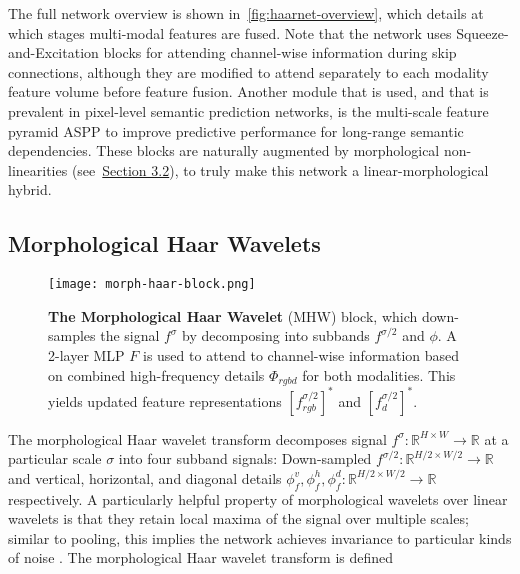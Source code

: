 \documentclass{article}
\begin{document}
The full network overview is shown in~\autoref{fig:haarnet-overview}, which details at which stages multi-modal features are fused.
Note that the network uses Squeeze-and-Excitation blocks \cite{hu2018squeeze} for attending channel-wise information during skip connections, although they are modified to attend separately to each modality feature volume before feature fusion.
Another module that is used, and that is prevalent in pixel-level semantic prediction networks, is the multi-scale feature pyramid ASPP \cite{chen2017deeplab} to improve predictive performance for long-range semantic dependencies.
These blocks are naturally augmented by morphological non-linearities (see~\hyperref[sec:method:relu-as-dilation]{Section 3.2}), to truly make this network a linear-morphological hybrid.


\subsection{Morphological Haar Wavelets} \label{sec:method:haar-module}
\begin{figure}[t]
\centering
\texttt{[image: morph-haar-block.png]}
\caption{
\textbf{The Morphological Haar Wavelet} (MHW) block, which down-samples the signal $f^{\sigma}$ by decomposing into subbands $f^{\sigma/2}$ and $\phi$. 
A 2-layer MLP $F$ is used to attend to channel-wise information based on combined high-frequency details $\Phi_{rgbd}$ for both modalities.
This yields updated feature representations $\left[f_{rgb}^{\sigma/2}\right]^{*}$ and $\left[f_{d}^{\sigma/2}\right]^{*}$.
}
\label{fig:haar-wavelet-block}
\end{figure}
The morphological Haar wavelet transform decomposes signal $f^{\sigma}\colon \mathbb{R}^{H\times W} \to \mathbb{R}$ at a particular scale $\sigma$ into four subband signals: Down-sampled $f^{\sigma/2}\colon \mathbb{R}^{H/2\times W/2} \to \mathbb{R}$ and vertical, horizontal, and diagonal details $\phi^{v}_{f},\phi^{h}_{f},\phi^{d}_{f}\colon \mathbb{R}^{H/2\times W/2} \to \mathbb{R}$ respectively.
A particularly helpful property of morphological wavelets over linear wavelets is that they retain local maxima of the signal over multiple scales; similar to pooling, this implies the network achieves invariance to particular kinds of noise \cite{jarrett2009best}.
The morphological Haar wavelet transform \cite{heijmans1991morphological} is defined
\end{document}
